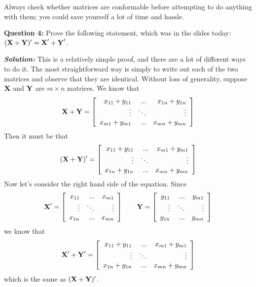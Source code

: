 \documentclass[12pt]{article}
\begin{document}
Always check whether matrices are conformable before attempting to do anything with them; you could save yourself a lot of time and hassle.

\textbf{Question 4:} Prove the following statement, which was in the slides today: $(\textrm{\textbf{X}}+\textrm{\textbf{Y}})' = \textrm{\textbf{X}}' + \textrm{\textbf{Y}}'$.
\medskip

\textbf{\textit{Solution:}} This is a relatively simple proof, and there are a lot of different ways to do it. The most straightforward way is simply to write out each of the two matrices and observe that they are identical. Without loss of generality, suppose $\textrm{\textbf{X}}$ and $\textrm{\textbf{Y}}$ are $m \times n$ matrices. We know that $$\textrm{\textbf{X}} + \textrm{\textbf{Y}} = \left[\begin{array}{rrr}
x_{11}+y_{11} & ... & x_{1n}+y_{1n}\\
\vdots & \ddots & \vdots\\
x_{m1}+y_{m1} & ... & x_{mn}+y_{mn}\end{array}\right]$$
Then it must be that
$$(\textrm{\textbf{X}} + \textrm{\textbf{Y}})' = \left[\begin{array}{rrr}
x_{11}+y_{11} & ... & x_{m1}+y_{m1}\\
\vdots & \ddots & \vdots\\
x_{1n}+y_{1n} & ... & x_{mn}+y_{mn}\end{array}\right]$$
Now let's consider the right hand side of the equation. Since
$$\textrm{\textbf{X}}' = \left[\begin{array}{rrr}
x_{11} & ... & x_{m1}\\
\vdots & \ddots & \vdots\\
x_{1n} & ... & x_{mn}\end{array}\right] \qquad \textrm{\textbf{Y}} = \left[\begin{array}{rrr}
y_{11} & ... & y_{m1}\\
\vdots & \ddots & \vdots\\
y_{1n} & ... & y_{mn}\end{array}\right]$$
we know that
$$\textrm{\textbf{X}}' + \textrm{\textbf{Y}}' =  \left[\begin{array}{rrr}
x_{11}+y_{11} & ... & x_{m1}+y_{m1}\\
\vdots & \ddots & \vdots\\
x_{1n}+y_{1n} & ... & x_{mn}+y_{mn}\end{array}\right]$$
which is the same as $(\textrm{\textbf{X}} + \textrm{\textbf{Y}})'$.
\end{document}
